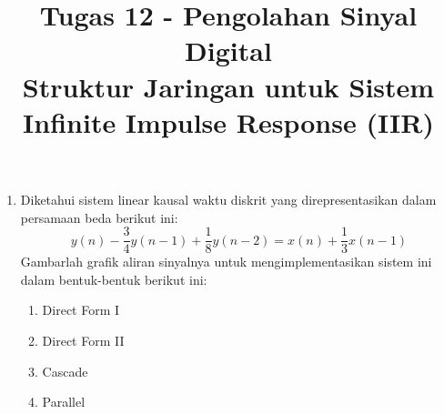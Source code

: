 \documentclass[12pt,a4paper]{article}
\title{Tugas 12 - Pengolahan Sinyal Digital\\
	Struktur Jaringan untuk Sistem Infinite Impulse Response (IIR)}
\date{}
\begin{document}
	\maketitle
	\date{}
	\begin{enumerate}
		\item Diketahui sistem linear kausal waktu diskrit yang direpresentasikan dalam persamaan beda berikut ini:
		\[ y(n) - \frac{3}{4}y(n-1) + \frac{1}{8}y(n-2) = x(n) + \frac{1}{3}x(n-1) \]
		Gambarlah grafik aliran sinyalnya untuk mengimplementasikan sistem ini dalam bentuk-bentuk berikut ini:
		\begin{enumerate}
			\item Direct Form I
			\item Direct Form II
			\item Cascade
			\item Parallel
		\end{enumerate}
	\end{enumerate}
\end{document}
